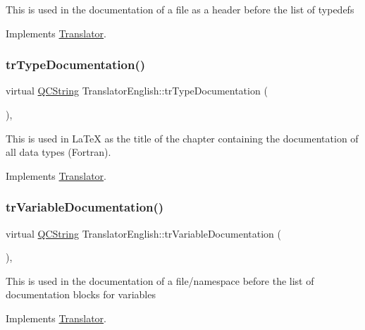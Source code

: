 This is used in the documentation of a file as a header before the list of typedefs 

Implements \mbox{\hyperlink{class_translator}{Translator}}.

\mbox{\label{class_translator_english_a71dd0dca6c5e6867d4cc377f46b7609a}} 
\subsubsection{\texorpdfstring{trTypeDocumentation()}{trTypeDocumentation()}}
{\footnotesize\ttfamily virtual \mbox{\hyperlink{class_q_c_string}{Q\+C\+String}} Translator\+English\+::tr\+Type\+Documentation (\begin{DoxyParamCaption}{ }\end{DoxyParamCaption})\hspace{0.3cm}{\ttfamily [inline]}, {\ttfamily [virtual]}}

This is used in La\+TeX as the title of the chapter containing the documentation of all data types (Fortran). 

Implements \mbox{\hyperlink{class_translator}{Translator}}.

\mbox{\label{class_translator_english_abc9436926f2390e89e7f2ea63dcc07c4}} 
\subsubsection{\texorpdfstring{trVariableDocumentation()}{trVariableDocumentation()}}
{\footnotesize\ttfamily virtual \mbox{\hyperlink{class_q_c_string}{Q\+C\+String}} Translator\+English\+::tr\+Variable\+Documentation (\begin{DoxyParamCaption}{ }\end{DoxyParamCaption})\hspace{0.3cm}{\ttfamily [inline]}, {\ttfamily [virtual]}}

This is used in the documentation of a file/namespace before the list of documentation blocks for variables 

Implements \mbox{\hyperlink{class_translator}{Translator}}.


